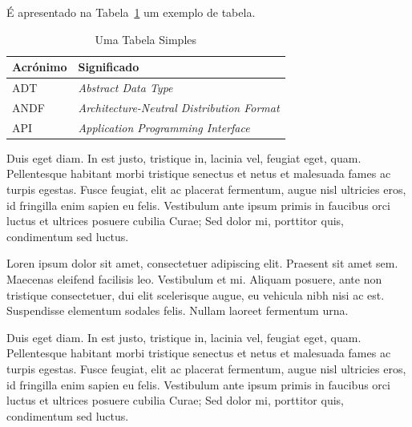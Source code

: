 \documentclass[twocolumn,twoside,10pt,a4paper]{article}
\begin{document}
É apresentado na Tabela~\ref{tab:exemplo1} um exemplo de tabela.

\begin{table}[h]
  \centering
  \caption{Uma Tabela Simples}
\begin{tabular}{| l | p{45mm} |}
	\hline
\textbf{Acrónimo} & \textbf{Significado}\\
	\hline
	\hline
        ADT   & \emph{Abstract Data Type}\\\hline
        ANDF  & \emph{Architecture-Neutral Distribution Format}\\\hline
        API   & \emph{Application Programming Interface}\\
	\hline
\end{tabular}
  \label{tab:exemplo1}
\end{table}

Duis eget diam. In est justo, tristique in, lacinia vel, feugiat eget,
quam. Pellentesque habitant morbi tristique senectus et netus et
malesuada fames ac turpis egestas. Fusce feugiat, elit ac placerat
fermentum, augue nisl ultricies eros, id fringilla enim sapien eu
felis. Vestibulum ante ipsum primis in faucibus orci luctus et
ultrices posuere cubilia Curae; Sed dolor mi, porttitor quis,
condimentum sed luctus. 

Loren ipsum dolor sit amet, consectetuer adipiscing elit. 
Praesent sit amet sem. Maecenas eleifend facilisis leo. Vestibulum et
mi. Aliquam posuere, ante non tristique consectetuer, dui elit
scelerisque augue, eu vehicula nibh nisi ac est. Suspendisse elementum
sodales felis. Nullam laoreet fermentum urna. 

Duis eget diam. In est justo, tristique in, lacinia vel, feugiat eget,
quam. Pellentesque habitant morbi tristique senectus et netus et
malesuada fames ac turpis egestas. Fusce feugiat, elit ac placerat
fermentum, augue nisl ultricies eros, id fringilla enim sapien eu
felis. Vestibulum ante ipsum primis in faucibus orci luctus et
ultrices posuere cubilia Curae; Sed dolor mi, porttitor quis,
condimentum sed luctus. 
\end{document}

